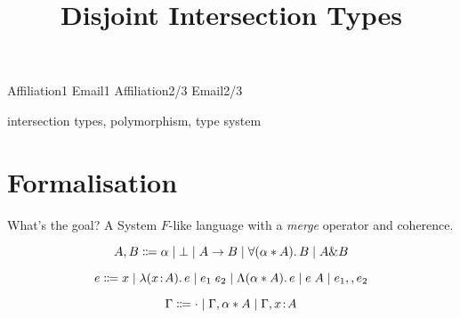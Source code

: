 \documentclass[nocopyrightspace,preprint,times,9pt]{sigplanconf}
\begin{document}


\preprintfooter{\name}                        %

\title{Disjoint Intersection Types}

           {Affiliation1}
           {Email1}
           {Affiliation2/3}
           {Email2/3}

\maketitle


\keywords intersection types, polymorphism, type system

\section{Formalisation}

What's the goal? A System $F$-like language with a \emph{merge} operator and coherence.


\begin{equation}
  A, B \Coloneqq \alpha \mid \bot \mid A \to B \mid \forall (\alpha * A).\, B \mid A \& B
\end{equation}

\begin{equation}
  e \Coloneqq x \mid \lambda (x \!:\! A).\, e \mid e_1 \; e_2 \mid \Lambda (\alpha * A).\, e \mid e \; A \mid e_1 ,, e_2
\end{equation}

\begin{equation}
  \Gamma \Coloneqq \cdot
                   \mid \Gamma, \alpha * A
                   \mid \Gamma, x \!:\! A
\end{equation}



\end{document}
